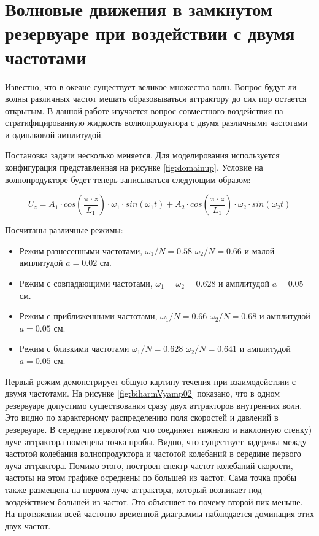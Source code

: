 \chapter{Волновые движения в замкнутом резервуаре при воздействии с двумя частотами}



Известно, что в океане существует великое множество волн. Вопрос будут ли волны различных частот мешать образовываться аттрактору до сих пор остается открытым. В данной работе изучается вопрос совместного воздействия на стратифицированную жидкость волнопродуктора с двумя различными частотами и одинаковой амплитудой. 

Постановка задачи несколько меняется. Для моделирования используется конфигурация представленная на рисунке \ref{fig:domainup}. Условие на волнопродукторе будет теперь записываться следующим образом:

\begin{equation}
    U_z = A_1\cdot cos\left(\frac{\pi \cdot z}{L_1}\right)\cdot \omega_1 \cdot  sin(\omega_1 t) + A_2\cdot cos\left(\frac{\pi \cdot z}{L_1}\right)\cdot \omega_2 \cdot  sin(\omega_2 t)
\end{equation}

Посчитаны различные режимы:

\begin{itemize}
    \item Режим разнесенными частотами, $\omega_1/N=0.58$ $\omega_2/N=0.66$ и малой амплитудой $a=0.02$ см. 
    \item Режим с совпадающими частотами, $\omega_1=\omega_2=0.628$ и амплитудой $a=0.05$ см.
    \item Режим с приближенными частотами, $\omega_1/N=0.66$ $\omega_2/N=0.68$ и амплитудой $a=0.05$ см.
    \item Режим с близкими частотами $\omega_1/N=0.628$ $\omega_2/N=0.641$ и  амплитудой $a=0.05$ см.
\end{itemize}

Первый режим демонстрирует общую картину течения при взаимодействии с двумя частотами. На рисунке \ref{fig:biharmVyamp02} показано, что в одном резервуаре допустимо существования сразу двух аттракторов внутренних волн. Это видно по характерному распределению поля скоростей и давлений в резервуаре. В середине первого(том что соединяет нижнюю и наклонную стенку) луче аттрактора помещена точка пробы. Видно, что существует задержка между частотой колебания волнопродуктора и частотой колебаний в середине первого луча аттрактора. Помимо этого, построен спектр частот колебаний скорости, частоты на этом графике осреднены по большей из частот. Сама точка пробы также размещена на первом луче аттрактора, который возникает под воздействием большей из частот. Это объясняет то почему второй пик меньше. На протяжении всей частотно-временной диаграммы наблюдается доминация этих двух частот.

